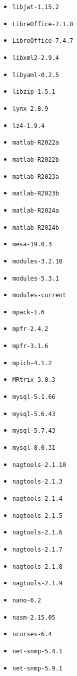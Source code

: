 \begin{multicols}{3}
\begin{itemize}
\item \verb|libjwt-1.15.2|
\item \verb|LibreOffice-7.1.8|
\item \verb|LibreOffice-7.4.7|
\item \verb|libxml2-2.9.4|
\item \verb|libyaml-0.2.5|
\item \verb|libzip-1.5.1|
\item \verb|lynx-2.8.9|
\item \verb|lz4-1.9.4|
\item \verb|matlab-R2022a|
\item \verb|matlab-R2022b|
\item \verb|matlab-R2023a|
\item \verb|matlab-R2023b|
\item \verb|matlab-R2024a|
\item \verb|matlab-R2024b|
\item \verb|mesa-19.0.3|
\item \verb|modules-3.2.10|
\item \verb|modules-5.3.1|
\item \verb|modules-current|
\item \verb|mpack-1.6|
\item \verb|mpfr-2.4.2|
\item \verb|mpfr-3.1.6|
\item \verb|mpich-4.1.2|
\item \verb|MRtrix-3.0.3|
\item \verb|mysql-5.1.66|
\item \verb|mysql-5.6.43|
\item \verb|mysql-5.7.43|
\item \verb|mysql-8.0.31|
\item \verb|nagtools-2.1.10|
\item \verb|nagtools-2.1.3|
\item \verb|nagtools-2.1.4|
\item \verb|nagtools-2.1.5|
\item \verb|nagtools-2.1.6|
\item \verb|nagtools-2.1.7|
\item \verb|nagtools-2.1.8|
\item \verb|nagtools-2.1.9|
\item \verb|nano-6.2|
\item \verb|nasm-2.15.05|
\item \verb|ncurses-6.4|
\item \verb|net-snmp-5.4.1|
\item \verb|net-snmp-5.9.1|

\end{itemize}
\end{multicols}
